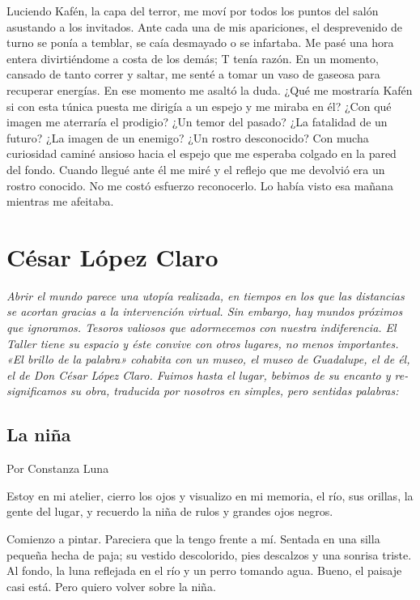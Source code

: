 \documentclass[11pt,twoside,openright,a5paper]{book}
\begin{document}
Luciendo Kafén, la capa del terror, me moví por todos los puntos del salón asustando a los invitados. Ante cada una de mis apariciones, el desprevenido de turno se ponía a temblar, se caía desmayado o se infartaba. Me pasé una hora entera divirtiéndome a costa de los demás; T tenía razón. En un momento, cansado de tanto correr y saltar, me senté a tomar un vaso de gaseosa para recuperar energías. En ese momento me asaltó la duda. ¿Qué me mostraría Kafén si con esta túnica puesta me dirigía a un espejo y me miraba en él? ¿Con qué imagen me aterraría el prodigio? ¿Un temor del pasado? ¿La fatalidad de un futuro? ¿La imagen de un enemigo? ¿Un rostro desconocido? Con mucha curiosidad caminé ansioso hacia el espejo que me esperaba colgado en la pared del fondo. Cuando llegué ante él me miré y el reflejo que me devolvió era un rostro conocido. No me costó esfuerzo reconocerlo. Lo había visto esa mañana mientras me afeitaba.

\chapter*{César López Claro}
\vspace{0.5cm}
\emph{Abrir el mundo parece una utopía realizada, en tiempos en los que las distancias se acortan gracias a la intervención virtual.
Sin embargo, hay mundos próximos que ignoramos. Tesoros valiosos que adormecemos con nuestra indiferencia.
El Taller tiene su espacio y éste convive con otros lugares, no menos importantes.
«El brillo de la palabra» cohabita con un museo, el museo de Guadalupe, el de él, el de Don César López Claro. 
Fuimos hasta el lugar, bebimos de su encanto y re-significamos su obra, traducida por nosotros en simples, pero sentidas palabras:}

\section*{La niña}
                                                                                                     \begin{flushright}Por Constanza Luna\end{flushright}

Estoy en mi atelier, cierro los ojos y visualizo en mi memoria, el río, sus orillas, la gente del lugar, y recuerdo la niña de rulos y grandes ojos negros.

Comienzo a pintar. Pareciera que la tengo frente a mí. Sentada en una silla pequeña hecha de paja; su vestido descolorido, pies descalzos y una sonrisa triste. Al fondo, la luna reflejada en el río y un perro tomando agua. Bueno, el paisaje casi está. Pero quiero volver sobre la niña.
\end{document}

